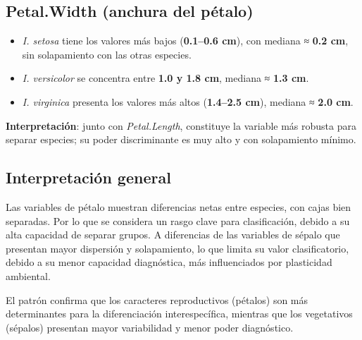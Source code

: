 \documentclass[
  spanish,
  11pt,
  a4paper,
  DIV=11,
  numbers=noendperiod]{scrartcl}
\providecommand{\tightlist}{%
  \setlength{\itemsep}{0pt}\setlength{\parskip}{0pt}}
\begin{document}
\subsection{Petal.Width (anchura del
pétalo)}\label{petal.width-anchura-del-puxe9talo}

\begin{itemize}
\tightlist
\item
  \emph{I. setosa} tiene los valores más bajos (\textbf{0.1--0.6 cm}),
  con mediana ≈ \textbf{0.2 cm}, sin solapamiento con las otras
  especies.\\
\item
  \emph{I. versicolor} se concentra entre \textbf{1.0 y 1.8 cm}, mediana
  ≈ \textbf{1.3 cm}.\\
\item
  \emph{I. virginica} presenta los valores más altos (\textbf{1.4--2.5
  cm}), mediana ≈ \textbf{2.0 cm}.
\end{itemize}

\textbf{Interpretación}: junto con \emph{Petal.Length}, constituye la
variable más robusta para separar especies; su poder discriminante es
muy alto y con solapamiento mínimo.

\subsection{Interpretación general}\label{interpretaciuxf3n-general}

Las variables de pétalo muestran diferencias netas entre especies, con
cajas bien separadas. Por lo que se considera un rasgo clave para
clasificación, debido a su alta capacidad de separar grupos. A
diferencias de las variables de sépalo que presentan mayor dispersión y
solapamiento, lo que limita su valor clasificatorio, debido a su menor
capacidad diagnóstica, más influenciados por plasticidad ambiental.

El patrón confirma que los caracteres reproductivos (pétalos) son más
determinantes para la diferenciación interespecífica, mientras que los
vegetativos (sépalos) presentan mayor variabilidad y menor poder
diagnóstico.
\end{document}
